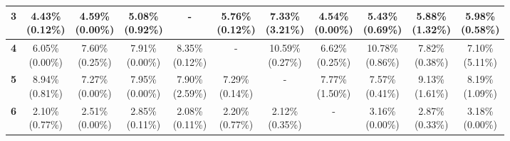 \documentclass{report}
\begin{document}
\begin{center}
{\begin{tabular}{|c|c|c|c|c|c|c|c|c|c|c|}
  \textbf{3} & \makecell{4.43\% \\ (0.12\%)} & \makecell{4.59\% \\ (0.00\%)} & \makecell{5.08\% \\ (0.92\%)} & - & \makecell{5.76\% \\ (0.12\%)} & \makecell{7.33\% \\ (3.21\%)} & \makecell{4.54\% \\ (0.00\%)} & \makecell{5.43\% \\ (0.69\%)} & \makecell{5.88\% \\ (1.32\%)} & \makecell{5.98\% \\ (0.58\%)} \\ \hline
  \textbf{4} & \makecell{6.05\% \\ (0.00\%)} & \makecell{7.60\% \\ (0.25\%)} & \makecell{7.91\% \\ (0.00\%)} & \makecell{8.35\% \\ (0.12\%)} & - & \makecell{10.59\% \\ (0.27\%)} & \makecell{6.62\% \\ (0.25\%)} & \makecell{10.78\% \\ (0.86\%)} & \makecell{7.82\% \\ (0.38\%)} & \makecell{7.10\% \\ (5.11\%)} \\ \hline
  \textbf{5} & \makecell{8.94\% \\ (0.81\%)} & \makecell{7.27\% \\ (0.00\%)} & \makecell{7.95\% \\ (0.00\%)} & \makecell{7.90\% \\ (2.59\%)} & \makecell{7.29\% \\ (0.14\%)} & - & \makecell{7.77\% \\ (1.50\%)} & \makecell{7.57\% \\ (0.41\%)} & \makecell{9.13\% \\ (1.61\%)} & \makecell{8.19\% \\ (1.09\%)} \\ \hline
  \textbf{6} & \makecell{2.10\% \\ (0.77\%)} & \makecell{2.51\% \\ (0.00\%)} & \makecell{2.85\% \\ (0.11\%)} & \makecell{2.08\% \\ (0.11\%)} & \makecell{2.20\% \\ (0.77\%)} & \makecell{2.12\% \\ (0.35\%)} & - & \makecell{3.16\% \\ (0.00\%)} & \makecell{2.87\% \\ (0.33\%)} & \makecell{3.18\% \\ (0.00\%)} \\ \hline

\end{tabular}}
\end{center}
\end{document}
